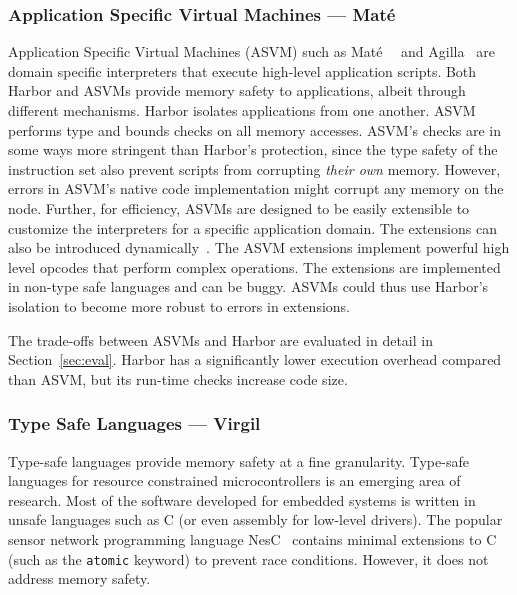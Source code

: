 \subsubsection{Application Specific Virtual Machines --- Mat\'e}
%
Application Specific Virtual Machines (ASVM) such as
Mat\'e~\cite{asvm05nsdi}~\cite{levis02mate} and
Agilla~\cite{agilla05ipsn} are domain specific interpreters that
execute high-level application scripts.
%
Both Harbor and ASVMs provide memory safety to applications, albeit
through different mechanisms.
%
Harbor isolates applications from one another.
%
ASVM performs type and bounds checks on all memory accesses.
%
ASVM's checks are in some ways more stringent than Harbor's protection,
since the type safety of the instruction set also prevent scripts from
corrupting \emph{their own} memory.
%
However, errors in ASVM's native code implementation might corrupt any
memory on the node.
%
Further, for efficiency, ASVMs are designed to be easily extensible to
customize the interpreters for a specific application domain.
%
The extensions can also be introduced dynamically~\cite{balani06dvm}.
%
The ASVM extensions implement powerful high level opcodes that perform
complex operations.
%
The extensions are implemented in non-type safe languages and can be
buggy.
%
ASVMs could thus use Harbor's isolation to become more robust to errors in
extensions.


The trade-offs between ASVMs and Harbor are evaluated in detail in
Section~\ref{sec:eval}.
%
Harbor has a significantly lower execution overhead compared than ASVM,
%
but its run-time checks 
increase code size.
%
\subsubsection{Type Safe Languages --- Virgil}
%
Type-safe languages provide memory safety at a fine granularity.
%
Type-safe languages for resource constrained microcontrollers is an
emerging area of research.
%
Most of the software developed for embedded systems is written in
unsafe languages such as C (or even assembly for low-level drivers). 
%
The popular sensor network programming language NesC~\cite{gay03nesc}
contains minimal extensions to C (such as the \texttt{atomic} keyword)
to prevent race conditions.
%
However, it does not address memory safety.


